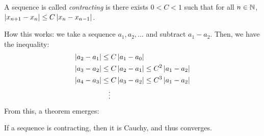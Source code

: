 \begin{definition}
    A sequence is called \textit{contracting} is there exists \(0 < C < 1\) such that for all \(n \in \mathbb{N}\), \(\left|x_{n+1} - x_n\right| \leq C\left|x_n - x_{n-1}\right|\).
\end{definition}

How this works: we take a sequence \(a_1, a_2, \dots\) and subtract \(a_1 - a_2\). Then, we have the inequality: \begin{align*}
    \left|a_2 - a_1\right| & \leq C\left|a_1 - a_0\right|                            \\
    \left|a_3 - a_2\right| & \leq C\left|a_2 - a_1\right| \leq C^2\left|a_1 - a_2\right| \\
    \left|a_4 - a_3\right| & \leq C\left|a_3 - a_2\right| \leq C^3\left|a_1 - a_2\right| \\
                       & \quad \vdots
\end{align*} From this, a theorem emerges:

\begin{theorem}
    If a sequence is contracting, then it is Cauchy, and thus converges.
\end{theorem}

